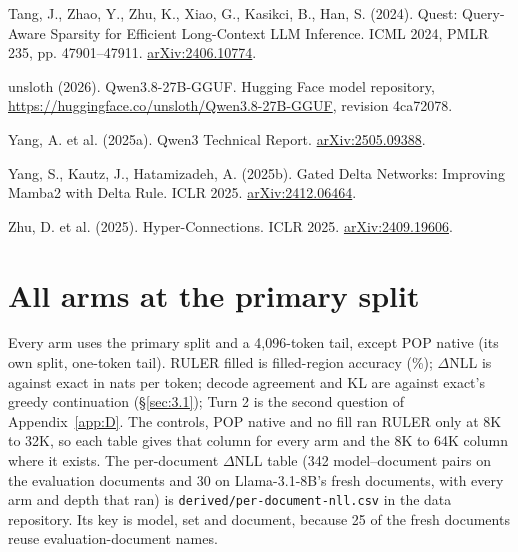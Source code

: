 \documentclass[11pt]{article}
\begin{document}
\begin{list}{}{\setlength{\leftmargin}{1.5em}\setlength{\itemindent}{-1.5em}\setlength{\itemsep}{1pt}\setlength{\parsep}{0pt}}
\item Tang, J., Zhao, Y., Zhu, K., Xiao, G., Kasikci, B., Han, S. (2024). Quest: Query-Aware Sparsity for Efficient Long-Context LLM Inference. ICML 2024, PMLR 235, pp. 47901--47911. \href{https://arxiv.org/abs/2406.10774}{arXiv:2406.10774}.
\item unsloth (2026). Qwen3.8-27B-GGUF. Hugging Face model repository, \url{https://huggingface.co/unsloth/Qwen3.8-27B-GGUF}, revision 4ca72078.
\item Yang, A. et al. (2025a). Qwen3 Technical Report. \href{https://arxiv.org/abs/2505.09388}{arXiv:2505.09388}.
\item Yang, S., Kautz, J., Hatamizadeh, A. (2025b). Gated Delta Networks: Improving Mamba2 with Delta Rule. ICLR 2025. \href{https://arxiv.org/abs/2412.06464}{arXiv:2412.06464}.
\item Zhu, D. et al. (2025). Hyper-Connections. ICLR 2025. \href{https://arxiv.org/abs/2409.19606}{arXiv:2409.19606}.
\end{list}

\clearpage
\appendix
{}

\section{All arms at the primary split}\label{app:A}
Every arm uses the primary split and a 4,096-token tail, except POP native (its own split, one-token tail). RULER filled is filled-region accuracy (\%); $\Delta$NLL is against exact in nats per token; decode agreement and KL are against exact's greedy continuation (\S\ref{sec:3.1}); Turn 2 is the second question of Appendix~\ref{app:D}. The controls, POP native and no fill ran RULER only at 8K to 32K, so each table gives that column for every arm and the 8K to 64K column where it exists. The per-document $\Delta$NLL table (342 model--document pairs on the evaluation documents and 30 on Llama-3.1-8B's fresh documents, with every arm and depth that ran) is \texttt{derived/\allowbreak{}per-\allowbreak{}document-\allowbreak{}nll.\allowbreak{}csv} in the data repository. Its key is model, set and document, because 25 of the fresh documents reuse evaluation-document names.
\end{document}
